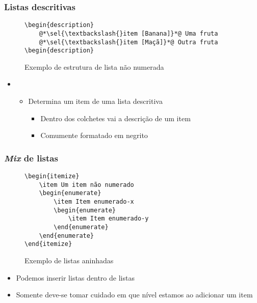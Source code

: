 \begin{frame}[fragile] \frametitle{Listas descritivas}
\begin{figure}[!t]
\caption{Exemplo de estrutura de lista não numerada}
\begin{lstlisting}
\begin{description}
	@*\sel{\textbackslash{}item [Banana]}*@ Uma fruta
	@*\sel{\textbackslash{}item [Maçã]}*@ Outra fruta
\begin{description}
\end{lstlisting}
\ownsrc
\end{figure}

\begin{itemize}
	\item {}
	\begin{itemize}
		\item Determina um item de uma lista descritiva
		\begin{itemize}
			\item Dentro dos colchetes vai a descrição de um item
			\item Comumente formatado em negrito
		\end{itemize}
	\end{itemize}
\end{itemize}
\end{frame}

\begin{frame}[fragile] \frametitle{\textit{Mix} de listas}
\begin{figure}[!t]
\caption{Exemplo de listas aninhadas}
\begin{lstlisting}
\begin{itemize}
	\item Um item não numerado
	\begin{enumerate}
		\item Item enumerado-x
		\begin{enumerate}
			\item Item enumerado-y
		\end{enumerate}
	\end{enumerate}
\end{itemize}
\end{lstlisting}
\ownsrc
\end{figure}

\begin{itemize}
	\item Podemos inserir listas dentro de listas
	\item Somente deve-se tomar cuidado em que nível estamos ao adicionar um item
\end{itemize}
\end{frame}